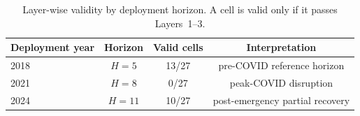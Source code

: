 \begin{table}[htbp]
\centering
\caption{Layer-wise validity by deployment horizon. A cell is valid only if it
passes Layers~1--3.}
\label{tab:horizon-validity}
\begin{tabular}{lccc}
\toprule
Deployment year & Horizon & Valid cells & Interpretation \\
\midrule
2018 & \(H=5\)  & 13/27 & pre-COVID reference horizon \\
2021 & \(H=8\)  & 0/27 & peak-COVID disruption \\
2024 & \(H=11\) & 10/27 & post-emergency partial recovery \\
\bottomrule
\end{tabular}
\end{table}
